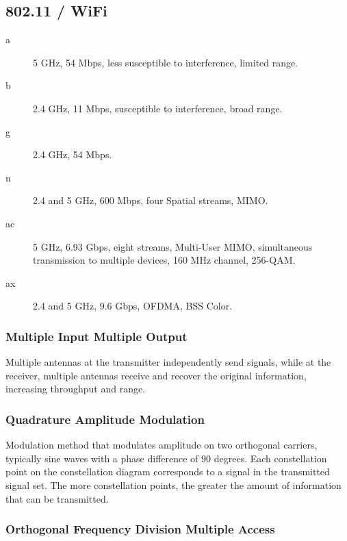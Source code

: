\documentclass[11pt,journal,compsoc]{IEEEtran}
\begin{document}
\subsection{802.11 / WiFi}

\begin{description}
    \item[a] 5 GHz, 54 Mbps, less susceptible to interference, limited range.
    
    \item[b] 2.4 GHz, 11 Mbps, susceptible to interference, broad range.
    
    \item[g] 2.4 GHz, 54 Mbps.
    
    \item[n] 2.4 and 5 GHz, 600 Mbps, four Spatial streams, MIMO.
    
    \item[ac] 5 GHz, 6.93 Gbps, eight streams, Multi-User MIMO, simultaneous transmission to multiple devices, 160 MHz channel, 256-QAM.
    
    \item[ax] 2.4 and 5 GHz, 9.6 Gbps, OFDMA, BSS Color.
\end{description}

\subsubsection{Multiple Input Multiple Output}

Multiple antennas at the transmitter independently send signals, while at the receiver, multiple antennas receive and recover the original information, increasing throughput and range.

\subsubsection{Quadrature Amplitude Modulation}

Modulation method that modulates amplitude on two orthogonal carriers, typically sine waves with a phase difference of 90 degrees. Each constellation point on the constellation diagram corresponds to a signal in the transmitted signal set. The more constellation points, the greater the amount of information that can be transmitted.

\subsubsection{Orthogonal Frequency Division Multiple Access}
\end{document}
